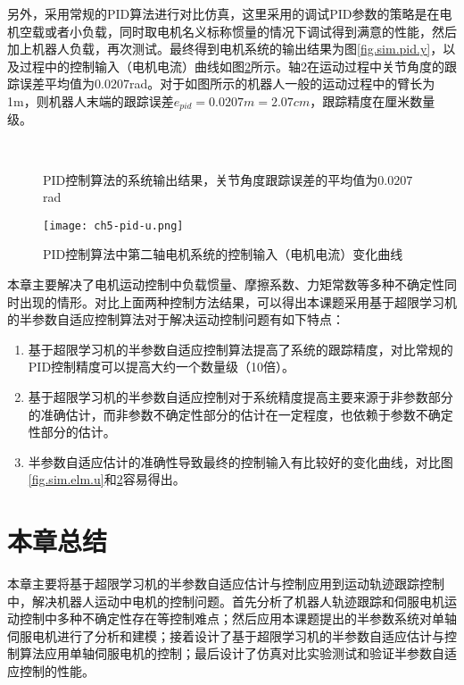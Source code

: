 另外，采用常规的PID算法进行对比仿真，这里采用的调试PID参数的策略是在电机空载或者小负载，同时取电机名义标称惯量的情况下调试得到满意的性能，然后加上机器人负载，再次测试。最终得到电机系统的输出结果为图\ref{fig.sim.pid.y}，以及过程中的控制输入（电机电流）曲线如图\ref{fig.sim.pid.u}所示。轴2在运动过程中关节角度的跟踪误差平均值为$0.0207$rad。对于如图所示的机器人一般的运动过程中的臂长为1m，则机器人末端的跟踪误差$e_{pid}=0.0207m=2.07cm$，跟踪精度在厘米数量级。
\begin{figure}[!htb]
	\centering
	\\
	\caption{PID控制算法的系统输出结果，关节角度跟踪误差的平均值为$0.0207$rad}
	\label{fig.sim.pid.yye}
\end{figure}

\begin{figure}[!htb]
	\centering
	\texttt{[image: ch5-pid-u.png]}\\	 %
	\caption{PID控制算法中第二轴电机系统的控制输入（电机电流）变化曲线}
	\label{fig.sim.pid.u}
\end{figure}

本章主要解决了电机运动控制中负载惯量、摩擦系数、力矩常数等多种不确定性同时出现的情形。对比上面两种控制方法结果，可以得出本课题采用基于超限学习机的半参数自适应控制算法对于解决运动控制问题有如下特点：
\begin{enumerate}
\item 基于超限学习机的半参数自适应控制算法提高了系统的跟踪精度，对比常规的PID控制精度可以提高大约一个数量级（10倍）。
\item 基于超限学习机的半参数自适应控制对于系统精度提高主要来源于非参数部分的准确估计，而非参数不确定性部分的估计在一定程度，也依赖于参数不确定性部分的估计。
\item 半参数自适应估计的准确性导致最终的控制输入有比较好的变化曲线，对比图\ref{fig.sim.elm.u}和\ref{fig.sim.pid.u}容易得出。
\end{enumerate}

\section{本章总结}
本章主要将基于超限学习机的半参数自适应估计与控制应用到运动轨迹跟踪控制中，解决机器人运动中电机的控制问题。首先分析了机器人轨迹跟踪和伺服电机运动控制中多种不确定性存在等控制难点；然后应用本课题提出的半参数系统对单轴伺服电机进行了分析和建模；接着设计了基于超限学习机的半参数自适应估计与控制算法应用单轴伺服电机的控制；最后设计了仿真对比实验测试和验证半参数自适应控制的性能。
